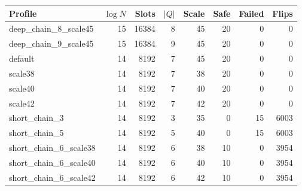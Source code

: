 \begin{tabular}{lrrrrrrr}
\toprule
Profile & $\log N$ & Slots & $|Q|$ & Scale & Safe & Failed & Flips \\
\midrule
deep\_chain\_8\_scale45 & 15 & 16384 & 8 & 45 & 20 & 0 & 0 \\
deep\_chain\_9\_scale45 & 15 & 16384 & 9 & 45 & 20 & 0 & 0 \\
default & 14 & 8192 & 7 & 45 & 20 & 0 & 0 \\
scale38 & 14 & 8192 & 7 & 38 & 20 & 0 & 0 \\
scale40 & 14 & 8192 & 7 & 40 & 20 & 0 & 0 \\
scale42 & 14 & 8192 & 7 & 42 & 20 & 0 & 0 \\
short\_chain\_3 & 14 & 8192 & 3 & 35 & 0 & 15 & 6003 \\
short\_chain\_5 & 14 & 8192 & 5 & 40 & 0 & 15 & 6003 \\
short\_chain\_6\_scale38 & 14 & 8192 & 6 & 38 & 10 & 0 & 3954 \\
short\_chain\_6\_scale40 & 14 & 8192 & 6 & 40 & 10 & 0 & 3954 \\
short\_chain\_6\_scale42 & 14 & 8192 & 6 & 42 & 10 & 0 & 3954 \\
\bottomrule
\end{tabular}
